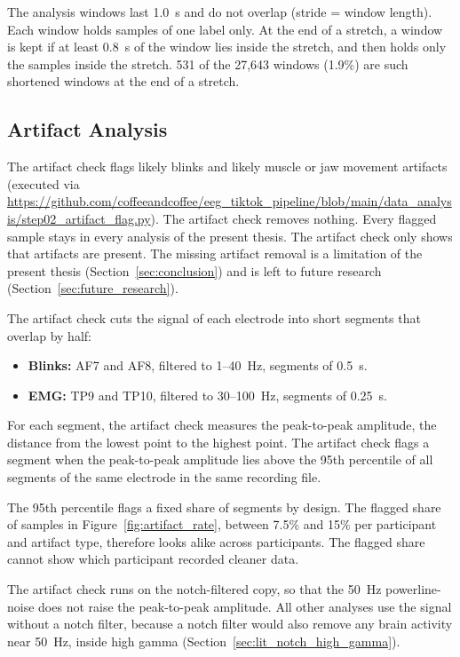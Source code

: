 \documentclass[12pt,a4paper]{report}
\begin{document}
The analysis windows last 1.0~s and do not overlap (stride = window length). Each window holds samples of one label only. At the end of a stretch, a window is kept if at least 0.8~s of the window lies inside the stretch, and then holds only the samples inside the stretch. 531 of the 27,643 windows (1.9\%) are such shortened windows at the end of a stretch.

\subsection{Artifact Analysis}
\label{sec:method_artifact_analysis}
The artifact check flags likely blinks and likely muscle or jaw movement artifacts (executed via \url{https://github.com/coffeeandcoffee/eeg_tiktok_pipeline/blob/main/data_analysis/step02_artifact_flag.py}). The artifact check removes nothing. Every flagged sample stays in every analysis of the present thesis. The artifact check only shows that artifacts are present. The missing artifact removal is a limitation of the present thesis (Section~\ref{sec:conclusion}) and is left to future research (Section~\ref{sec:future_research}).

The artifact check cuts the signal of each electrode into short segments that overlap by half:
\begin{itemize}
    \item \textbf{Blinks:} AF7 and AF8, filtered to 1--40~Hz, segments of 0.5~s.
    \item \textbf{EMG:} TP9 and TP10, filtered to 30--100~Hz, segments of 0.25~s.
\end{itemize}
For each segment, the artifact check measures the peak-to-peak amplitude, the distance from the lowest point to the highest point. The artifact check flags a segment when the peak-to-peak amplitude lies above the 95th percentile of all segments of the same electrode in the same recording file.

The 95th percentile flags a fixed share of segments by design. The flagged share of samples in Figure~\ref{fig:artifact_rate}, between 7.5\% and 15\% per participant and artifact type, therefore looks alike across participants. The flagged share cannot show which participant recorded cleaner data.

The artifact check runs on the notch-filtered copy, so that the 50~Hz powerline-noise does not raise the peak-to-peak amplitude. All other analyses use the signal without a notch filter, because a notch filter would also remove any brain activity near 50~Hz, inside high gamma (Section~\ref{sec:lit_notch_high_gamma}).
\end{document}
